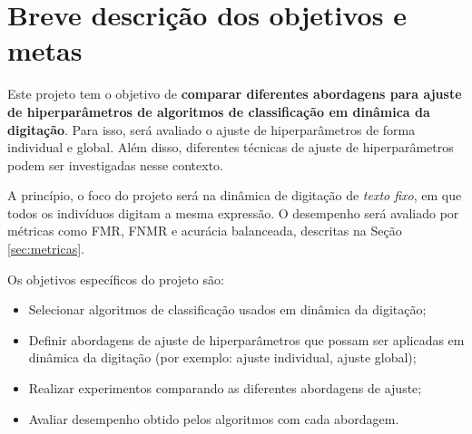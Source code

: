\section{Breve descrição dos objetivos e metas}
\label{sec:objetivos}

Este projeto tem o objetivo de \textbf{comparar diferentes abordagens para ajuste de hiperparâmetros de algoritmos de classificação em dinâmica da digitação}. Para isso, será avaliado o ajuste de hiperparâmetros de forma individual e global. Além disso, diferentes técnicas de ajuste de hiperparâmetros podem ser investigadas nesse contexto.

A princípio, o foco do projeto será na dinâmica de digitação de \textit{texto fixo}, em que todos os indivíduos digitam a mesma expressão. O desempenho será avaliado por métricas como FMR, FNMR e acurácia balanceada, descritas na Seção \ref{sec:metricas}.

Os objetivos específicos do projeto são:

\begin{itemize}
    \item Selecionar algoritmos de classificação usados em dinâmica da digitação;
    \item Definir abordagens de ajuste de hiperparâmetros que possam ser aplicadas em dinâmica da digitação (por exemplo: ajuste individual, ajuste global);
    \item Realizar experimentos comparando as diferentes abordagens de ajuste;
    \item Avaliar desempenho obtido pelos algoritmos com cada abordagem.
\end{itemize}
